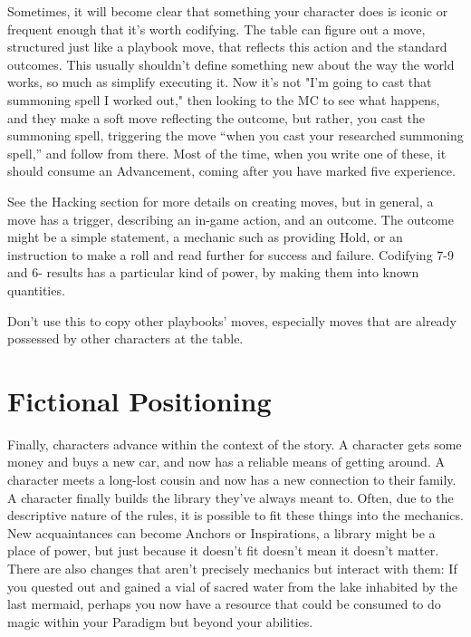 \documentclass[
  oneside,
  statementpaper,
  9pt]{memoir}
\begin{document}
\begin{Player}

Sometimes, it will become clear that something your character does is iconic or frequent enough that it’s worth codifying. The table can figure out a move, structured just like a playbook move, that reflects this action and the standard outcomes. This usually shouldn’t define something new about the way the world works, so much as simplify executing it. Now it’s not "I’m going to cast that summoning spell I worked out," then looking to the MC to see what happens, and they make a soft move reflecting the outcome, but rather, you cast the summoning spell, triggering the move “when you cast your researched summoning spell,” and follow from there. Most of the time, when you write one of these, it should consume an Advancement, coming after you have marked five experience.

See the Hacking section for more details on creating moves, but in general, a move has a trigger, describing an in-game action, and an outcome. The outcome might be a simple statement, a mechanic such as providing Hold, or an instruction to make a roll and read further for success and failure. Codifying 7-9 and 6- results has a particular kind of power, by making them into known quantities.

Don’t use this to copy other playbooks’ moves, especially moves that are already possessed by other characters at the table.

\end{Player}

\hypertarget{fictional-positioning}{%
\section{Fictional Positioning}\label{fictional-positioning}}

\begin{Player}

Finally, characters advance within the context of the story. A character gets some money and buys a new car, and now has a reliable means of getting around. A character meets a long-lost cousin and now has a new connection to their family. A character finally builds the library they’ve always meant to. Often, due to the descriptive nature of the rules, it is possible to fit these things into the mechanics. New acquaintances can become Anchors or Inspirations, a library might be a place of power, but just because it doesn’t fit doesn’t mean it doesn’t matter. There are also changes that aren’t precisely mechanics but interact with them: If you quested out and gained a vial of sacred water from the lake inhabited by the last mermaid, perhaps you now have a resource that could be consumed to do magic within your Paradigm but beyond your abilities.

\end{Player}
\end{document}

